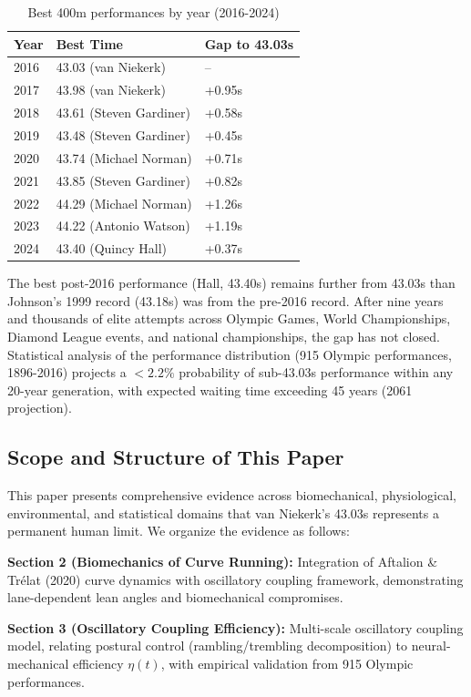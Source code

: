 \documentclass[twocolumn,10pt]{article}
\begin{document}
\begin{table}[H]
\centering
\caption{Best 400m performances by year (2016-2024)}
\begin{tabular}{@{}lll@{}}
\toprule
\textbf{Year} & \textbf{Best Time} & \textbf{Gap to 43.03s} \\
\midrule
2016 & 43.03 (van Niekerk) & -- \\
2017 & 43.98 (van Niekerk) & +0.95s \\
2018 & 43.61 (Steven Gardiner) & +0.58s \\
2019 & 43.48 (Steven Gardiner) & +0.45s \\
2020 & 43.74 (Michael Norman) & +0.71s \\
2021 & 43.85 (Steven Gardiner) & +0.82s \\
2022 & 44.29 (Michael Norman) & +1.26s \\
2023 & 44.22 (Antonio Watson) & +1.19s \\
2024 & 43.40 (Quincy Hall) & +0.37s \\
\bottomrule
\end{tabular}
\end{table}

The best post-2016 performance (Hall, 43.40s) remains further from 43.03s than Johnson's 1999 record (43.18s) was from the pre-2016 record. After nine years and thousands of elite attempts across Olympic Games, World Championships, Diamond League events, and national championships, the gap has not closed. Statistical analysis of the performance distribution (915 Olympic performances, 1896-2016) projects a $<2.2\%$ probability of sub-43.03s performance within any 20-year generation, with expected waiting time exceeding 45 years (2061 projection).

\subsection{Scope and Structure of This Paper}

This paper presents comprehensive evidence across biomechanical, physiological, environmental, and statistical domains that van Niekerk's 43.03s represents a permanent human limit. We organize the evidence as follows:

\textbf{Section 2 (Biomechanics of Curve Running):} Integration of Aftalion \& Trélat (2020) curve dynamics with oscillatory coupling framework, demonstrating lane-dependent lean angles and biomechanical compromises.

\textbf{Section 3 (Oscillatory Coupling Efficiency):} Multi-scale oscillatory coupling model, relating postural control (rambling/trembling decomposition) to neural-mechanical efficiency $\eta(t)$, with empirical validation from 915 Olympic performances.
\end{document}
